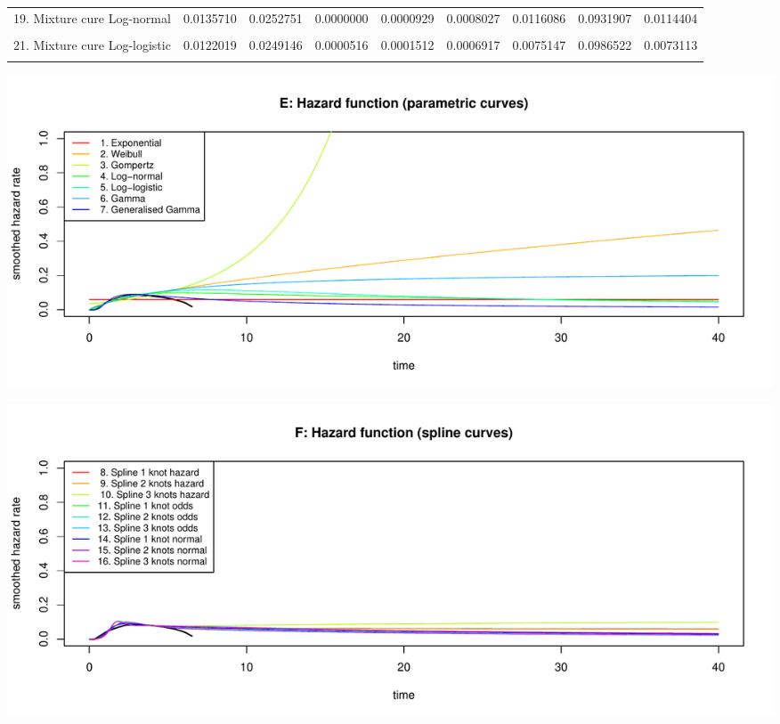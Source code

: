 \documentclass[]{article}
\begin{document}
\begin{table}
{\begin{tabular}[t]{lrrrrrrrr}
19. Mixture cure Log-normal & 0.0135710 & 0.0252751 & 0.0000000 & 0.0000929 & 0.0008027 & 0.0116086 & 0.0931907 & 0.0114404\\
\cellcolor{gray!6}{20. Non-mixture cure Log-normal} & \cellcolor{gray!6}{0.0140594} & \cellcolor{gray!6}{0.0251944} & \cellcolor{gray!6}{0.0000000} & \cellcolor{gray!6}{0.0001962} & \cellcolor{gray!6}{0.0012968} & \cellcolor{gray!6}{0.0132969} & \cellcolor{gray!6}{0.0934968} & \cellcolor{gray!6}{0.0130702}\\
21. Mixture cure Log-logistic & 0.0122019 & 0.0249146 & 0.0000516 & 0.0001512 & 0.0006917 & 0.0075147 & 0.0986522 & 0.0073113\\
\cellcolor{gray!6}{22. Non-mixture cure Log-logistic} & \cellcolor{gray!6}{0.0121786} & \cellcolor{gray!6}{0.0249023} & \cellcolor{gray!6}{0.0000517} & \cellcolor{gray!6}{0.0001509} & \cellcolor{gray!6}{0.0006881} & \cellcolor{gray!6}{0.0074554} & \cellcolor{gray!6}{0.0987027} & \cellcolor{gray!6}{0.0072528}\\
\bottomrule
\end{tabular}}
\end{table}

\begin{flushleft}\includegraphics[height=0.29\textheight]{Images/validate_extrapolation1-5} \end{flushleft}

\begin{flushleft}\includegraphics[height=0.29\textheight]{Images/validate_extrapolation1-6} \end{flushleft}
\end{document}
